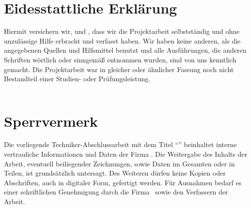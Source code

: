 \documentclass[../main.tex]{subfiles}
\begin{document}
	
	\section*{Eidesstattliche Erklärung}
	Hiermit versichern wir,  und , dass wir die Projektarbeit selbstständig und ohne unzulässige Hilfe erbracht und verfasst haben.
	Wir haben keine anderen, als die angegebenen Quellen und Hilfsmittel benutzt und alle Ausführungen, die anderen Schriften wörtlich oder sinngemäß entnommen wurden,
	sind von uns kenntlich gemacht. Die Projektarbeit war in gleicher oder ähnlicher Fassung noch nicht Bestandteil einer Studien- oder Prüfungsleistung.
	\vspace{1cm} \\
	\vspace{1cm}\\
	
	\section*{Sperrvermerk}
	Die vorliegende Techniker-Abschlussarbeit mit dem Titel \enquote{\untertitel} beinhaltet interne vertrauliche Informationen und Daten der Firma \firma.
	Die Weitergabe des Inhalts der Arbeit, eventuell beiliegender Zeichnungen, sowie Daten im Gesamten oder in Teilen, ist grundsätzlich untersagt. Des Weiteren dürfen keine Kopien oder Abschriften, auch in digitaler Form, gefertigt werden.
	Für Ausnahmen bedarf es einer schriftlichen Genehmigung durch die Firma \firma\ sowie den Verfassern der Arbeit.
\end{document}
